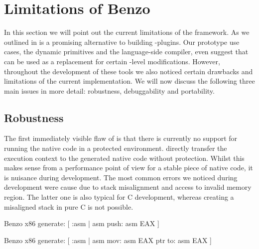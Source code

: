\section{Limitations of Benzo}
In this section we will point out the current limitations of the \B framework.
As we outlined in  \B is a promising alternative to building \VM-plugins.
Our prototype use cases, the dynamic primitives and the language-side \JIT compiler, even suggest that \B can be used as a replacement for certain \VM-level modifications.
However, throughout the development of these tools we also noticed certain drawbacks and limitations of the current \B implementation.
We will now discuss the following three main issues in more detail: robustness, debuggability and portability.

\subsection{Robustness}

The first immediately visible flaw of \B is that there is currently no support for running the native code in a protected environment.
\B directly transfer the execution context to the generated native code without protection.
Whilst this makes sense from a performance point of view for a stable piece of native code, it is nuisance during development.
The most common errors we noticed during development were cause due to stack misalignment and access to invalid memory region.
The latter one is also typical for C development, whereas creating a misaligned stack in pure C is not possible.

\begin{stcode}[caption={Simple \B code possibly leading to an unbalanced stack.}]{}
Benzo x86 generate: [ :asm |
	asm push: asm EAX ]
\end{stcode}

\begin{stcode}[caption={\B code possibly leading memory access violation.}]{}
Benzo x86 generate: [ :asm |
	asm mov: asm EAX ptr to: asm EAX ]
\end{stcode}

